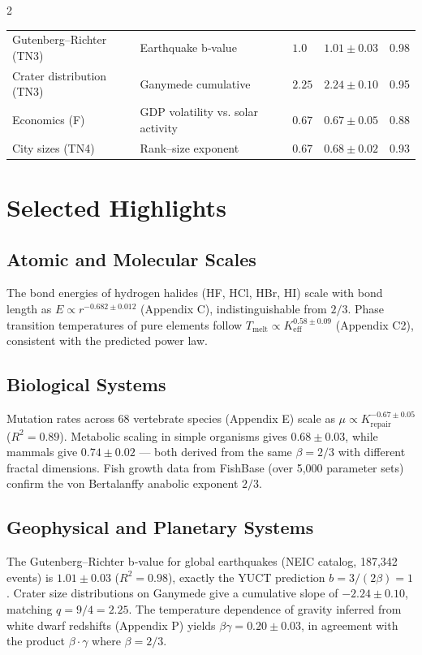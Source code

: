 \documentclass[11pt,a4paper]{article}
\newcommand{\betaf}{\beta}
\begin{document}
\begin{multicols}{2}
\begin{table}[htbp]
\begin{tabular}{p{3.5cm}p{5.0cm}p{2.1cm}p{3.5cm}p{1.4cm}}
				Gutenberg–Richter (TN3) & Earthquake b‑value & \(1.0\) & \(1.01 \pm 0.03\) & 0.98 \\
				Crater distribution (TN3) & Ganymede cumulative & \(2.25\) & \(2.24 \pm 0.10\) & 0.95 \\
				Economics (F) & GDP volatility vs. solar activity & \(0.67\) & \(0.67 \pm 0.05\) & 0.88 \\
				City sizes (TN4) & Rank–size exponent & \(0.67\) & \(0.68 \pm 0.02\) & 0.93 \\
				\bottomrule
			\end{tabular}
		\end{table}
		
		\section{Selected Highlights}
		
		\subsection{Atomic and Molecular Scales}
		The bond energies of hydrogen halides (HF, HCl, HBr, HI) scale with bond length as \(E \propto r^{-0.682\pm0.012}\) (Appendix C), indistinguishable from \(2/3\). Phase transition temperatures of pure elements follow \(T_{\text{melt}} \propto K_{\mathrm{eff}}^{0.58\pm0.09}\) (Appendix C2), consistent with the predicted power law.
		
		\subsection{Biological Systems}
		Mutation rates across 68 vertebrate species (Appendix E) scale as \(\mu \propto K_{\mathrm{repair}}^{-0.67\pm0.05}\) (\(R^2=0.89\)). Metabolic scaling in simple organisms gives \(0.68\pm0.03\), while mammals give \(0.74\pm0.02\) — both derived from the same \(\betaf = 2/3\) with different fractal dimensions. Fish growth data from FishBase (over 5,000 parameter sets) confirm the von Bertalanffy anabolic exponent \(2/3\).
		
		\subsection{Geophysical and Planetary Systems}
		The Gutenberg–Richter b‑value for global earthquakes (NEIC catalog, 187,342 events) is \(1.01\pm0.03\) (\(R^2=0.98\)), exactly the YUCT prediction \(b = 3/(2\betaf) = 1\). Crater size distributions on Ganymede give a cumulative slope of \(-2.24\pm0.10\), matching \(q = 9/4 = 2.25\). The temperature dependence of gravity inferred from white dwarf redshifts (Appendix P) yields \(\beta\gamma = 0.20 \pm 0.03\), in agreement with the product \(\betaf \cdot \gamma\) where \(\betaf = 2/3\).
		

\end{multicols}
\end{document}
